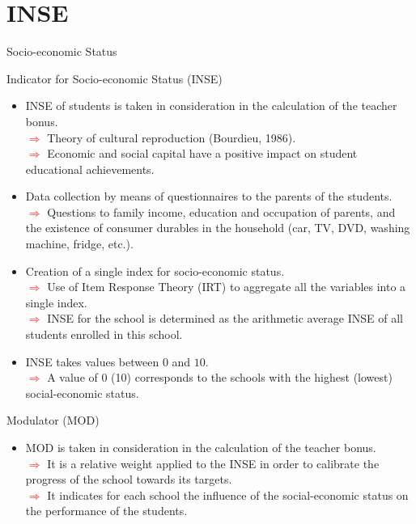 \documentclass{beamer}
\begin{document}
\section{INSE}

\begin{frame}[label=INSE]{Socio-economic Status}
\vspace{-45pt} \flushright \hyperlink{Mirror}{\beamerbutton{\textcolor{red}{Mirror}}}
\vspace{20pt}
\begin{block}{\centering Indicator for Socio-economic Status (INSE)}
 \begin{itemize}
\item [\sbt] \scriptsize INSE of students is taken in consideration in the calculation of the teacher bonus.
\\ \tiny\textcolor{red}{$\Longrightarrow$} Theory of cultural reproduction (Bourdieu, 1986).
\\ \tiny\textcolor{red}{$\Longrightarrow$} Economic and social capital have a positive impact on student educational achievements.
\item [\sbt] \scriptsize Data collection by means of questionnaires to the parents of the students.
\\ \tiny\textcolor{red}{$\Longrightarrow$} Questions to family income, education and occupation of parents, and the existence of consumer durables in the household (car, TV, DVD, washing machine, fridge, etc.).
\item [\sbt] \scriptsize Creation of a single index for socio-economic status.
\\ \tiny\textcolor{red}{$\Longrightarrow$} Use of Item Response Theory (IRT) to aggregate all the variables into a single index.
\\ \tiny\textcolor{red}{$\Longrightarrow$} INSE for the school is determined as the arithmetic average INSE of all students enrolled in this school.
\item [\sbt] \scriptsize INSE takes values between $0$ and $10$.
\\ \tiny\textcolor{red}{$\Longrightarrow$} A value of 0 (10) corresponds to the schools with the highest (lowest) social-economic status.
\end{itemize}
\end{block}

\vspace{10pt}
\begin{block}{\centering Modulator (MOD) }
 \begin{itemize}
\item [\sbt] \scriptsize MOD is taken in consideration in the calculation of the teacher bonus.
\\ \tiny\textcolor{red}{$\Longrightarrow$} It is a relative weight applied to the INSE in order to calibrate the progress of the school towards its targets.
\\ \tiny\textcolor{red}{$\Longrightarrow$} It indicates for each school the influence of the social-economic status on the performance of the students.
\end{itemize}
\end{block}
\end{frame}
\end{document}
